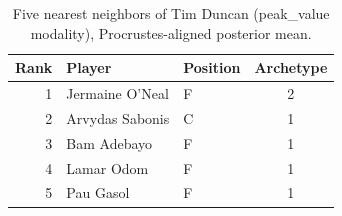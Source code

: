 \begin{table}[htbp]
  \centering\small
  \begin{tabular}{rllc}
    \toprule
    Rank & Player & Position & Archetype \\
    \midrule
    1 & Jermaine O'Neal & F & 2 \\
    2 & Arvydas Sabonis & C & 1 \\
    3 & Bam Adebayo & F & 1 \\
    4 & Lamar Odom & F & 1 \\
    5 & Pau Gasol & F & 1 \\
    \bottomrule
  \end{tabular}
  \caption{Five nearest neighbors of Tim Duncan (peak_value modality), Procrustes-aligned posterior mean.}
  \label{tab:Tim_Duncan_neighbors_peak_value}
\end{table}

